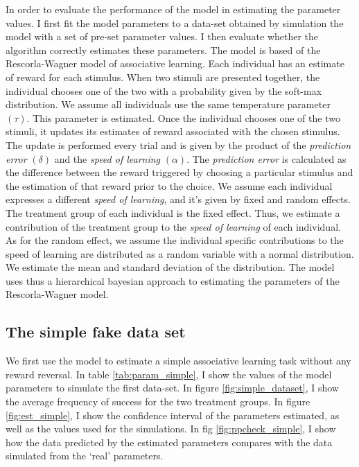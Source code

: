 \documentclass[
]{article}
\begin{document}
In order to evaluate the performance of the model in estimating the
parameter values. I first fit the model parameters to a data-set
obtained by simulation the model with a set of pre-set parameter values.
I then evaluate whether the algorithm correctly estimates these
parameters. The model is based of the Rescorla-Wagner model of
associative learning. Each individual has an estimate of reward for each
stimulus. When two stimuli are presented together, the individual
chooses one of the two with a probability given by the soft-max
distribution. We assume all individuals use the same temperature
parameter \((\tau)\). This parameter is estimated. Once the individual
chooses one of the two stimuli, it updates its estimates of reward
associated with the chosen stimulus. The update is performed every trial
and is given by the product of the \emph{prediction error} \((\delta)\)
and the \emph{speed of learning} \((\alpha)\). The \emph{prediction
error} is calculated as the difference between the reward triggered by
choosing a particular stimulus and the estimation of that reward prior
to the choice. We assume each individual expresses a different
\emph{speed of learning}, and it's given by fixed and random effects.
The treatment group of each individual is the fixed effect. Thus, we
estimate a contribution of the treatment group to the \emph{speed of
learning} of each individual. As for the random effect, we assume the
individual specific contributions to the speed of learning are
distributed as a random variable with a normal distribution. We estimate
the mean and standard deviation of the distribution. The model uses thus
a hierarchical bayesian approach to estimating the parameters of the
Rescorla-Wagner model.

\hypertarget{the-simple-fake-data-set}{%
\subsection{The simple fake data set}\label{the-simple-fake-data-set}}

We first use the model to estimate a simple associative learning task
without any reward reversal. In table \ref{tab:param_simple}, I show the
values of the model parameters to simulate the first data-set. In figure
\ref{fig:simple_dataset}, I show the average frequency of success for
the two treatment groups. In figure \ref{fig:est_simple}, I show the
confidence interval of the parameters estimated, as well as the values
used for the simulations. In fig \ref{fig:ppcheck_simple}, I show how
the data predicted by the estimated parameters compares with the data
simulated from the `real' parameters.
\end{document}
